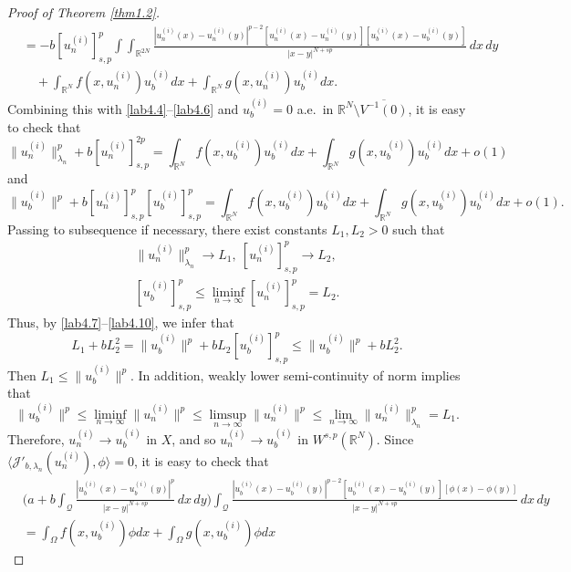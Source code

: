 \documentclass[reqno]{amsart}
\begin{document}
\begin{proof}[Proof of Theorem \ref{thm1.2}]
\begin{align*}
&=-b[u^{(i)}_n]^p_{s,p} \int\int_{\mathbb{R}^{2N}}\frac{|u^{(i)}_n(x)
 -u^{(i)}_n(y)|^{p-2}[u^{(i)}_n(x)-u^{(i)}_n(y)][u_b^{(i)}(x)
 -u_b^{(i)}(y)]}{|x-y|^{N+sp}}\,dx\,dy   \\
&\quad+\int_{\mathbb{R}^N}f(x,u_n^{(i)})u_b^{(i)}dx
 +\int_{\mathbb{R}^N}g(x,u_n^{(i)})u_b^{(i)}dx.
\end{align*}
Combining this with \eqref{lab4.4}--\eqref{lab4.6} and $u_b^{(i)}=0$ a.e.\
in $\mathbb{R}^N\setminus \overline{V^{-1}(0)}$, it is easy to check that
\begin{equation}\label{lab4.7}
 \|u^{(i)}_n\|^p_{\lambda_n}+ b[u^{(i)}_n]^{2p}_{s,p}
  = \int_{\mathbb{R}^N}f(x,u_b^{(i)})u_b^{(i)}dx
  +\int_{\mathbb{R}^N}g(x,u_b^{(i)})u_b^{(i)}dx+o(1)
\end{equation}
and
\begin{equation}\label{lab4.8}
 \|u_b^{(i)}\|^p+ b[u^{(i)}_n]^p_{s,p}[u_b^{(i)}]^p_{s,p}
 =\int_{\mathbb{R}^N}f(x,u_b^{(i)})u_b^{(i)}dx
  +\int_{\mathbb{R}^N}g(x,u_b^{(i)})u_b^{(i)}dx+o(1).
\end{equation}
Passing to subsequence if necessary, there exist constants $L_1, L_2>0$ such that
\begin{gather}\label{lab4.9}
\|u^{(i)}_n\|^p_{\lambda_n}\to  L_1,\ [u^{(i)}_n]^p_{s,p}\to  L_2, \\
\label{lab4.10}
[u_b^{(i)}]^p_{s,p}\leq\liminf_{n\to \infty}[u^{(i)}_n]^p_{s,p}=L_2.
\end{gather}
Thus, by  \eqref{lab4.7}--\eqref{lab4.10}, we infer that
$$
L_1+bL^2_2=\|u_b^{(i)}\|^p+bL_2 [u_b^{(i)}]^p_{s,p} \leq \|u_b^{(i)}\|^p+bL^2_2.
$$
Then $L_1\leq \|u_b^{(i)}\|^p$. In addition, weakly lower semi-continuity of 
norm implies that
\begin{equation}\label{lab4.11}
\|u_b^{(i)}\|^p\leq\liminf_{n\to \infty}\|u^{(i)}_n\|^p
\leq\limsup_{n\to \infty}\|u^{(i)}_n\|^p
\leq\lim_{n\to \infty}\|u^{(i)}_n\|^p_{\lambda_n}=L_1.
\end{equation}
Therefore, $u^{(i)}_n\to  u_b^{(i)}$ in $X$, and so $u^{(i)}_n\to  u_b^{(i)}$ in 
$W^{s,p}(\mathbb{R}^N)$. Since 
$\langle \mathcal{J}'_{b, \lambda_n}(u^{(i)}_n), \phi \rangle=0$, 
it is easy to check that
\begin{align*}
&\Big(a+b\int_\mathcal{Q}\frac{|u_b^{(i)}(x)-u_b^{(i)}(y)|^p}{|x-y|^{N+sp}}\,dx\,dy\Big)
\int_\mathcal{Q}\frac{|u_b^{(i)}(x)-u_b^{(i)}(y)|^{p-2}
[u_b^{(i)}(x)-u_b^{(i)}(y)][\phi(x)-\phi(y)]}{|x-y|^{N+sp}}\,dx\,dy   \\
&=\int_\Omega f(x,u_b^{(i)})\phi dx+\int_\Omega g(x,u_b^{(i)})\phi dx
\end{align*}

\end{proof}
\end{document}
